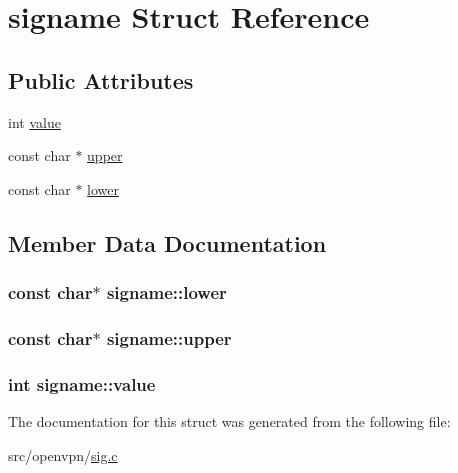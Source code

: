 \hypertarget{structsigname}{}\section{signame Struct Reference}
\label{structsigname}
\subsection*{Public Attributes}
\begin{DoxyCompactItemize}
\item 
int \hyperlink{structsigname_a28e5b66b3cb90ffcea4a93767a9b1cc1}{value}
\item 
const char $\ast$ \hyperlink{structsigname_a2fe87fa3a49550a0d5eac7503b6c074a}{upper}
\item 
const char $\ast$ \hyperlink{structsigname_a062edd3e3ceeae9bb951ebba40ca6bbe}{lower}
\end{DoxyCompactItemize}


\subsection{Member Data Documentation}
\hypertarget{structsigname_a062edd3e3ceeae9bb951ebba40ca6bbe}{}
\subsubsection[{lower}]{\setlength{\rightskip}{0pt plus 5cm}const char$\ast$ signame\+::lower}\label{structsigname_a062edd3e3ceeae9bb951ebba40ca6bbe}
\hypertarget{structsigname_a2fe87fa3a49550a0d5eac7503b6c074a}{}
\subsubsection[{upper}]{\setlength{\rightskip}{0pt plus 5cm}const char$\ast$ signame\+::upper}\label{structsigname_a2fe87fa3a49550a0d5eac7503b6c074a}
\hypertarget{structsigname_a28e5b66b3cb90ffcea4a93767a9b1cc1}{}
\subsubsection[{value}]{\setlength{\rightskip}{0pt plus 5cm}int signame\+::value}\label{structsigname_a28e5b66b3cb90ffcea4a93767a9b1cc1}


The documentation for this struct was generated from the following file\+:\begin{DoxyCompactItemize}
\item 
src/openvpn/\hyperlink{sig_8c}{sig.\+c}\end{DoxyCompactItemize}
